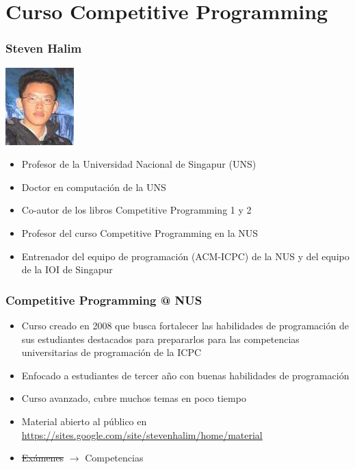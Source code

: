 \documentclass{beamer}
\begin{document}
\section{Curso Competitive Programming}
	\begin{frame}
		\frametitle{Steven Halim}
		\includegraphics[height = 0.25\textheight]{halim.jpg}
		\begin{itemize}
			\item{Profesor de la Universidad Nacional de Singapur (UNS)}
			\item{Doctor en computación de la UNS}
			\item{Co-autor de los libros Competitive Programming 1 y 2}
			\item{Profesor del curso Competitive Programming en la NUS}
			\item{Entrenador del equipo de programación (ACM-ICPC) de la NUS y del equipo de la IOI de Singapur}
		\end{itemize}
	\end{frame}
	
	\begin{frame}
		\frametitle{Competitive Programming @ NUS}
		\begin{itemize}
			\item{Curso creado en 2008 que busca fortalecer las habilidades de programación de sus estudiantes destacados para prepararlos para las competencias universitarias de programación de la ICPC}
			\item{Enfocado a estudiantes de tercer año con buenas habilidades de programación}
			\item{Curso avanzado, cubre muchos temas en poco tiempo}
			\item{Material abierto al público en \url{https://sites.google.com/site/stevenhalim/home/material}}
			\item \Large{\sout{Exámenes} $\rightarrow$ Competencias}
		\end{itemize}	
	\end{frame}
\end{document}
